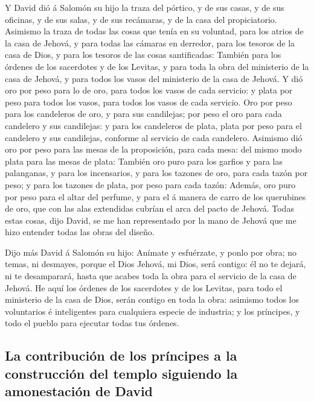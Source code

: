  Y David dió á Salomón su hijo la traza del pórtico, y de
sus casas, y de sus oficinas, y de sus salas, y de sus recámaras, y de
la casa del propiciatorio.  Asimismo la traza de todas las
cosas que tenía en su voluntad, para los atrios de la casa de Jehová, y
para todas las cámaras en derredor, para los tesoros de la casa de Dios,
y para los tesoros de las cosas santificadas:  También para
los órdenes de los sacerdotes y de los Levitas, y para toda la obra del
ministerio de la casa de Jehová, y para todos los vasos del ministerio
de la casa de Jehová.  Y dió oro por peso para lo de oro,
para todos los vasos de cada servicio: y plata por peso para todos los
vasos, para todos los vasos de cada servicio.  Oro por peso
para los candeleros de oro, y para sus candilejas; por peso el oro para
cada candelero y sus candilejas: y para los candeleros de plata, plata
por peso para el candelero y sus candilejas, conforme al servicio de
cada candelero.  Asimismo dió oro por peso para las mesas
de la proposición, para cada mesa: del mismo modo plata para las mesas
de plata:  También oro puro para los garfios y para las
palanganas, y para los incensarios, y para los tazones de oro, para cada
tazón por peso; y para los tazones de plata, por peso para cada tazón:
 Además, oro puro por peso para el altar del perfume, y
para el á manera de carro de los querubines de oro, que con las alas
extendidas cubrían el arca del pacto de Jehová.  Todas
estas cosas, dijo David, se me han representado por la mano de Jehová
que me hizo entender todas las obras del diseño.

 Dijo más David á Salomón su hijo: Anímate y esfuérzate, y
ponlo por obra; no temas, ni desmayes, porque el Dios Jehová, mi Dios,
será contigo: él no te dejará, ni te desamparará, hasta que acabes toda
la obra para el servicio de la casa de Jehová.  He aquí los
órdenes de los sacerdotes y de los Levitas, para todo el ministerio de
la casa de Dios, serán contigo en toda la obra: asimismo todos los
voluntarios é inteligentes para cualquiera especie de industria; y los
príncipes, y todo el pueblo para ejecutar todas tus órdenes.

\hypertarget{la-contribuciuxf3n-de-los-pruxedncipes-a-la-construcciuxf3n-del-templo-siguiendo-la-amonestaciuxf3n-de-david}{%
\subsection{La contribución de los príncipes a la construcción del
templo siguiendo la amonestación de
David}\label{la-contribuciuxf3n-de-los-pruxedncipes-a-la-construcciuxf3n-del-templo-siguiendo-la-amonestaciuxf3n-de-david}}

